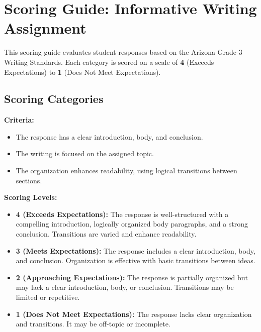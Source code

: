 \documentclass[12pt]{article}
\begin{document}
\section*{Scoring Guide: Informative Writing Assignment}

This scoring guide evaluates student responses based on the Arizona Grade 3 Writing Standards. Each category is scored on a scale of \textbf{4} (Exceeds Expectations) to \textbf{1} (Does Not Meet Expectations).

\subsection*{Scoring Categories}

\begin{tcolorbox}[colframe=black!60, colback=white, title=Purpose, Focus, and Organization]
\textbf{Criteria:}
\begin{itemize}
    \item The response has a clear introduction, body, and conclusion.
    \item The writing is focused on the assigned topic.
    \item The organization enhances readability, using logical transitions between sections.
\end{itemize}
\textbf{Scoring Levels:}
\begin{itemize}[label=\textbullet]
    \item \textbf{4 (Exceeds Expectations):} The response is well-structured with a compelling introduction, logically organized body paragraphs, and a strong conclusion. Transitions are varied and enhance readability.
    \item \textbf{3 (Meets Expectations):} The response includes a clear introduction, body, and conclusion. Organization is effective with basic transitions between ideas.
    \item \textbf{2 (Approaching Expectations):} The response is partially organized but may lack a clear introduction, body, or conclusion. Transitions may be limited or repetitive.
    \item \textbf{1 (Does Not Meet Expectations):} The response lacks clear organization and transitions. It may be off-topic or incomplete.
\end{itemize}
\end{tcolorbox}
\end{document}
